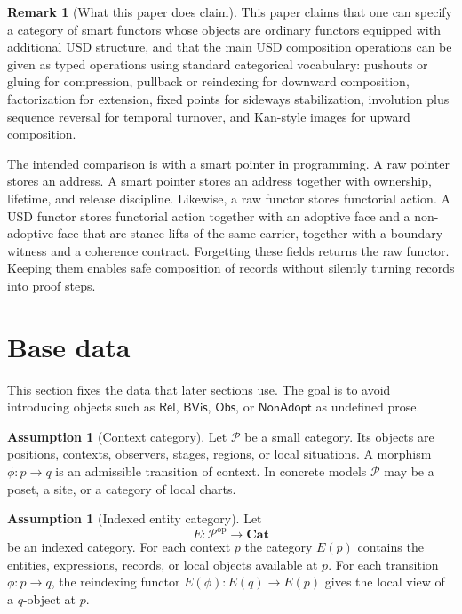\documentclass[11pt]{article}
\newcommand{\Rel}{\mathsf{Rel}}
\newcommand{\BVis}{\mathsf{BVis}}
\newcommand{\Obs}{\mathsf{Obs}}
\newcommand{\NonAdopt}{\mathsf{NonAdopt}}
\newcommand{\op}{\mathrm{op}}
\newcommand{\Cat}{\mathbf{Cat}}
\theoremstyle{definition}
\newtheorem{remark}[definition]{Remark}
\newtheorem{assumption}[definition]{Assumption}
\theoremstyle{plain}
\begin{document}
\begin{remark}[What this paper does claim]
This paper claims that one can specify a category of smart functors whose
objects are ordinary functors equipped with additional USD structure, and
that the main USD composition operations can be given as typed operations
using standard categorical vocabulary: pushouts or gluing for compression,
pullback or reindexing for downward composition, factorization for
extension, fixed points for sideways stabilization, involution plus
sequence reversal for temporal turnover, and Kan-style images for upward
composition.
\end{remark}

The intended comparison is with a smart pointer in programming.  A raw
pointer stores an address.  A smart pointer stores an address together
with ownership, lifetime, and release discipline.  Likewise, a raw functor
stores functorial action.  A USD functor stores functorial action together
with an adoptive face and a non-adoptive face that are stance-lifts of
the same carrier, together with a boundary witness and a coherence
contract.  Forgetting these fields returns the raw functor.
Keeping them enables safe composition of records without silently turning
records into proof steps.

\section{Base data}

This section fixes the data that later sections use.  The goal is to
avoid introducing objects such as $\Rel$, $\BVis$, $\Obs$, or $\NonAdopt$
as undefined prose.

\begin{assumption}[Context category]
Let $\mathcal P$ be a small category.  Its objects are positions,
contexts, observers, stages, regions, or local situations.  A morphism
$\phi:p\to q$ is an admissible transition of context.  In concrete
models $\mathcal P$ may be a poset, a site, or a category of local
charts.
\end{assumption}

\begin{assumption}[Indexed entity category]
Let
\[
  E:\mathcal P^{\op}\to \Cat
\]
be an indexed category.  For each context $p$ the category $E(p)$
contains the entities, expressions, records, or local objects available
at $p$.  For each transition $\phi:p\to q$, the reindexing functor
$E(\phi):E(q)\to E(p)$ gives the local view of a $q$-object at $p$.
\end{assumption}
\end{document}
